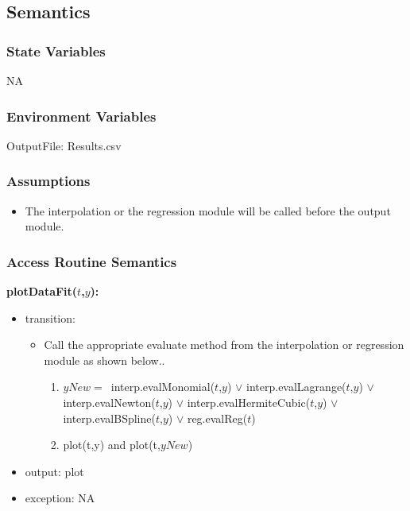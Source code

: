 \documentclass[12pt, titlepage]{article}
\begin{document}
\subsection{Semantics}

\subsubsection{State Variables}
NA


\subsubsection{Environment Variables}


OutputFile: Results.csv

\subsubsection{Assumptions}

\begin{itemize}
	
	\item The interpolation or the regression module will be called before the 
	output module.
	
\end{itemize}
\subsubsection{Access Routine Semantics}



\noindent \textbf{plotDataFit($t$,$y$):}
\begin{itemize}
	\item transition: 
	\begin{itemize}
		\item Call the appropriate evaluate method from the interpolation or 
		regression module as shown below..
		
		\begin{enumerate}
			
			\item $yNew = $\ interp.evalMonomial($t$,$y$) $\lor$ 
			interp.evalLagrange($t$,$y$) $\lor$
			interp.evalNewton($t$,$y$) $\lor$
			interp.evalHermiteCubic($t$,$y$) $\lor$
			interp.evalBSpline($t$,$y$) $\lor$
			reg.evalReg($t$)
			
			\item plot(t,y) and plot(t,$yNew$)
\end{enumerate}	
	\end{itemize}

	\item output:  plot
	
	\item exception: NA
\end{itemize}
\end{document}

